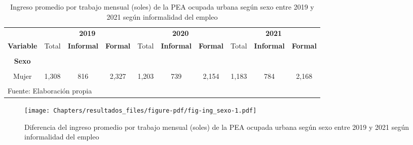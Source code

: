 \documentclass[
  letterpaper,
  12pt,
  oneside,
  spanish,
  doublespacing,
  headsepline,
  parskip]{MastersDoctoralThesis}
\begin{document}
\hypertarget{tbl-ing_sexo}{}
\begin{table}[H]
\caption{\label{tbl-ing_sexo}Ingreso promedio por trabajo mensual (soles) de la PEA ocupada urbana
según sexo entre 2019 y 2021 según informalidad del empleo }\tabularnewline

\centering\begingroup\fontsize{9}{11}\selectfont

\begin{tabular}{cccccccccc}
\toprule
\multicolumn{1}{c}{ } & \multicolumn{3}{c}{\textbf{2019}} & \multicolumn{3}{c}{\textbf{2020}} & \multicolumn{3}{c}{\textbf{2021}} \\
\cmidrule(l{3pt}r{3pt}){2-4} \cmidrule(l{3pt}r{3pt}){5-7} \cmidrule(l{3pt}r{3pt}){8-10}
\textbf{Variable} & Total & \textbf{Informal} & \textbf{Formal} & Total & \textbf{Informal} & \textbf{Formal} & Total & \textbf{Informal} & \textbf{Formal}\\
\midrule
\cellcolor{gray!6}{\textbf{Nacional}} & \cellcolor{gray!6}{1,595} & \cellcolor{gray!6}{1,037} & \cellcolor{gray!6}{2,599} & \cellcolor{gray!6}{1,407} & \cellcolor{gray!6}{901} & \cellcolor{gray!6}{2,380} & \cellcolor{gray!6}{1,443} & \cellcolor{gray!6}{989} & \cellcolor{gray!6}{2,473}\\
\textbf{Sexo} &  &  &  &  &  &  &  &  & \\
\cellcolor{gray!6}{Hombre} & \cellcolor{gray!6}{1,819} & \cellcolor{gray!6}{1,225} & \cellcolor{gray!6}{2,778} & \cellcolor{gray!6}{1,549} & \cellcolor{gray!6}{1,018} & \cellcolor{gray!6}{2,527} & \cellcolor{gray!6}{1,639} & \cellcolor{gray!6}{1,150} & \cellcolor{gray!6}{2,680}\\
Mujer & 1,308 & 816 & 2,327 & 1,203 & 739 & 2,154 & 1,183 & 784 & 2,168\\
\bottomrule
\multicolumn{10}{l}{\textsuperscript{} Fuente: Elaboración propia}\\
\end{tabular}
\endgroup{}
\end{table}

\begin{figure}

\caption{\label{fig-ing_sexo}Diferencia del ingreso promedio por trabajo
mensual (soles) de la PEA ocupada urbana según sexo entre 2019 y 2021
según informalidad del empleo}

{\centering \texttt{[image: Chapters/resultados\_files/figure-pdf/fig-ing\_sexo-1.pdf]}

}

\end{figure}
\end{document}
